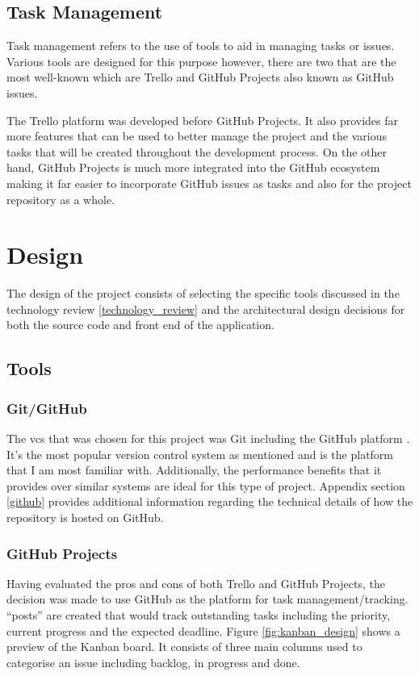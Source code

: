\documentclass[11pt]{article}
\begin{document}
\subsection{Task Management}
Task management refers to the use of tools to aid in managing tasks or issues.
Various tools are designed for this purpose however, there are two that are the most
well-known which are Trello and GitHub Projects also known as GitHub issues.

The Trello platform was developed before GitHub Projects. It also provides far
more features that can be used to better manage the project and the various
tasks that will be created throughout the development process. On the other
hand, GitHub Projects is much more integrated into the GitHub ecosystem making
it far easier to incorporate GitHub issues as tasks and also for the project
repository as a whole.

\clearpage
\section{Design} \label{design} 
The design of the project consists of selecting the specific tools discussed in
the technology review \ref{technology_review} and the architectural design
decisions for both the source code and front end of the application.

\subsection{Tools}
\subsubsection{Git/GitHub} \label{project_management}

The \gls*{vcs} that was chosen for this project was Git including the GitHub
platform \cite{gitvcs}. It's the most popular version control system as
mentioned and is the platform that I am most familiar with. Additionally, the
performance benefits that it provides over similar systems are ideal for this
type of project. Appendix section \ref{github} provides additional information
regarding the technical details of how the repository is hosted on GitHub.

\subsubsection{GitHub Projects}
Having evaluated the pros and cons of both Trello and GitHub Projects, the
decision was made to use GitHub as the platform for task management/tracking.
``posts'' are created that would track outstanding tasks including the priority,
current progress and the expected deadline. Figure \ref{fig:kanban_design} shows
a preview of the Kanban board. It consists of three main columns used to
categorise an issue including backlog, in progress and done.
\end{document}
